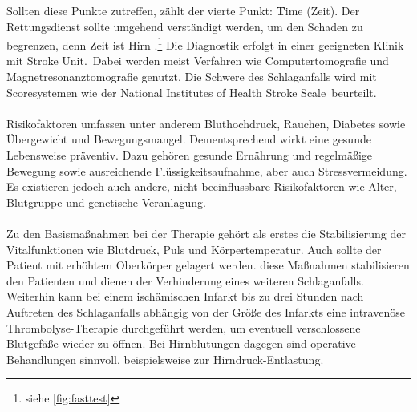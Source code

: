 Sollten diese Punkte zutreffen, zählt der vierte Punkt: \textbf{T}ime (Zeit). Der Rettungsdienst sollte umgehend verständigt werden, um den Schaden zu begrenzen, denn \glqq Zeit ist Hirn \grqq.\cite{Src:ApoFlex}\footnote[2]{siehe \autoref{fig:fasttest}}
Die Diagnostik erfolgt in einer geeigneten Klinik mit \glqq Stroke Unit\grqq .~Dabei werden meist Verfahren wie Computertomografie und Magnetresonanztomografie genutzt. Die Schwere des Schlaganfalls wird mit Scoresystemen wie der \glqq National Institutes of Health Stroke Scale\grqq ~beurteilt.
\\ \\
Risikofaktoren umfassen unter anderem Bluthochdruck, Rauchen, Diabetes sowie Übergewicht und Bewegungsmangel. Dementsprechend wirkt eine gesunde Lebensweise präventiv. Dazu gehören gesunde Ernährung und regelmäßige Bewegung sowie ausreichende Flüssigkeitsaufnahme, aber auch Stressvermeidung.\cite{Src:ApoFlex} Es existieren jedoch auch andere, nicht beeinflussbare Risikofaktoren wie Alter, Blutgruppe und genetische Veranlagung.
\\ \\
Zu den Basismaßnahmen bei der Therapie gehört als erstes die Stabilisierung der Vitalfunktionen wie Blutdruck, Puls und Körpertemperatur. Auch sollte der Patient mit erhöhtem Oberkörper gelagert werden. diese Maßnahmen stabilisieren den Patienten und dienen der Verhinderung eines weiteren Schlaganfalls. Weiterhin kann bei einem ischämischen Infarkt bis zu drei Stunden nach Auftreten des Schlaganfalls abhängig von der Größe des Infarkts eine intravenöse Thrombolyse-Therapie durchgeführt werden, um eventuell verschlossene Blutgefäße wieder zu öffnen. Bei Hirnblutungen dagegen sind operative Behandlungen sinnvoll, beispielsweise zur Hirndruck-Entlastung.\cite{Src:ApoFlex}
